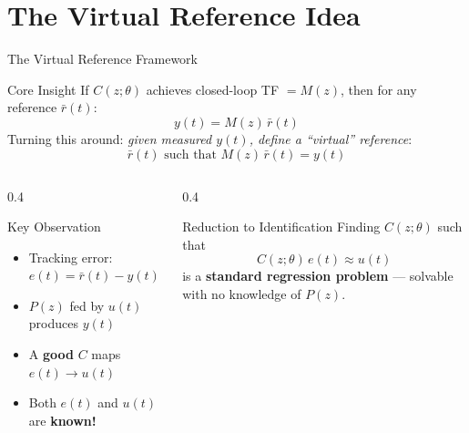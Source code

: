 \documentclass[aspectratio=169]{beamer}
\newcommand{\highlight}[1]{{\color{accentblue}\textbf{#1}}}
\begin{document}
\section{The Virtual Reference Idea}

\begin{frame}{The Virtual Reference Framework}
  \begin{block}{Core Insight}
    If $C(z;\theta)$ achieves closed-loop TF $= M(z)$, then for any reference $\bar{r}(t)$:
    \[
      y(t) = M(z)\,\bar{r}(t)
    \]
    Turning this around: \emph{given measured $y(t)$, define a ``virtual'' reference}:
    \[
      \bar{r}(t) \text{ such that } M(z)\,\bar{r}(t) = y(t)
    \]
  \end{block}


  \begin{columns}[T]
    \begin{column}{0.4\textwidth}
      \begin{exampleblock}{Key Observation}
        \begin{itemize}
          \item Tracking error: $e(t) = \bar{r}(t) - y(t)$
          \item $P(z)$ fed by $u(t)$ produces $y(t)$
          \item A \textbf{good} $C$ maps $e(t) \to u(t)$
          \item Both $e(t)$ and $u(t)$ are \highlight{known!}
        \end{itemize}
      \end{exampleblock}
    \end{column}
    \begin{column}{0.4\textwidth}
      \begin{alertblock}{Reduction to Identification}
        Finding $C(z;\theta)$ such that
        \[ C(z;\theta)\,e(t) \approx u(t) \]
        is a \textbf{standard regression problem} --- solvable with no knowledge of $P(z)$.
      \end{alertblock}
    \end{column}
  \end{columns}
\end{frame}
\end{document}
